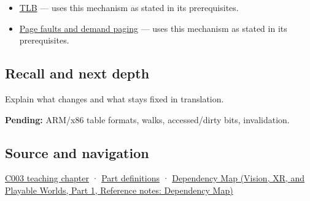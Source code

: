 \hypertarget{appendix-01e5905165c4-used-by}{}

\begin{itemize}
\tightlist
\item
  \hyperref[appendix-7a2d9c5ce511]{TLB} --- uses this mechanism as stated in its prerequisites.
\item
  \hyperref[appendix-cc0909a7ef14]{Page faults and demand paging} --- uses this mechanism as stated in its prerequisites.
\end{itemize}

\subsection{Recall and next depth}\label{appendix-01e5905165c4-recall-and-next-depth}

\hypertarget{appendix-01e5905165c4-recall-and-next-depth}{}

Explain what changes and what stays fixed in translation.

\textbf{Pending:} ARM/x86 table formats, walks, accessed/dirty bits, invalidation.

\subsection{Source and navigation}\label{appendix-01e5905165c4-source-and-navigation}

\hypertarget{appendix-01e5905165c4-source-and-navigation}{}

\hyperref[01-foundations-i-ch002-where-the-bytes-live]{C003 teaching chapter} · \hyperref[appendix-fd090d982a15-m003---parts-41-60]{Part definitions} · \href{../07-Vision-XR-and-Playable-Worlds-P01/main.pdf\#nameddest=appendix-4ad47bdd269a}{Dependency Map (Vision, XR, and Playable Worlds, Part 1, Reference notes: Dependency Map)}
